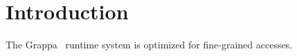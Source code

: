 \section{Introduction}
The Grappa~\cite{Nelson:hotpar11-real} runtime system is optimized for fine-grained accesses.

